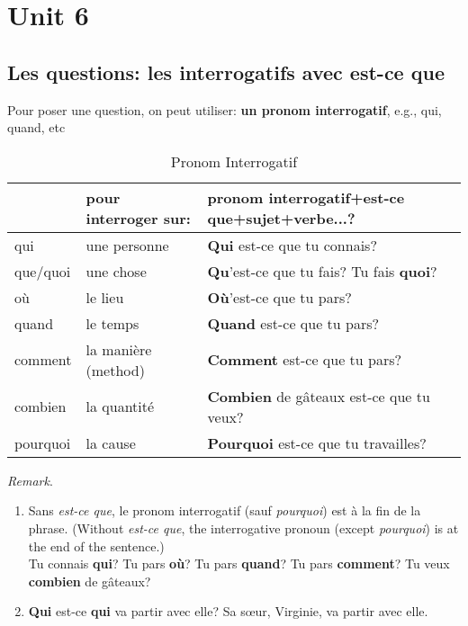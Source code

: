 \documentclass[math,code]{amznotes}
\theoremstyle{remark}
\begin{document}
\chapter{Unit 6}
\section{Les questions: les interrogatifs avec est-ce que}
Pour poser une question, on peut utiliser: \textbf{un pronom interrogatif}, e.g., qui, quand, etc

\begin{table}[h]
\centering
\begin{tabular}{|l|l|l|}
\hline
         & pour interroger sur: & pronom interrogatif+est-ce que+sujet+verbe...? \\ \hline
qui      & une personne         & \textbf{Qui} est-ce que tu connais?                     \\ \hline
que/quoi & une chose            & \textbf{Qu}'est-ce que tu fais? Tu fais \textbf{quoi}?            \\ \hline
où       & le lieu              & \textbf{Où}'est-ce que tu pars?                         \\ \hline
quand    & le temps             & \textbf{Quand} est-ce que tu pars?                      \\ \hline
comment  & la manière (method)  & \textbf{Comment} est-ce que tu pars?                    \\ \hline
combien  & la quantité          & \textbf{Combien} de gâteaux est-ce que tu veux?         \\ \hline
pourquoi & la cause             & \textbf{Pourquoi} est-ce que tu travailles?             \\ \hline
\end{tabular}
\caption{Pronom Interrogatif}
\label{tab:pronom-interrogatif}
\end{table}

\begin{notebox}
    \textit{Remark}.
    \begin{enumerate}
        \item Sans \textit{est-ce que}, le pronom interrogatif (sauf \textit{pourquoi}) est à la fin de la phrase. (Without \textit{est-ce que}, the interrogative pronoun (except \textit{pourquoi}) is at the end of the sentence.) \\
        Tu connais \textbf{qui}? Tu pars \textbf{où}? Tu pars \textbf{quand}? Tu pars \textbf{comment}? Tu veux \textbf{combien} de gâteaux?
        \item \textbf{Qui} est-ce \textbf{qui} va partir avec elle? Sa sœur, Virginie, va partir avec elle.
    \end{enumerate}
\end{notebox}
\end{document}
